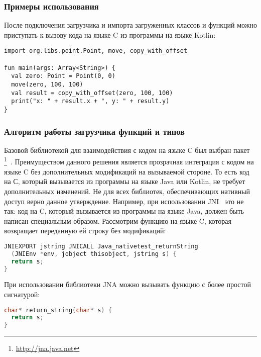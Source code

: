 \subsubsection{Примеры использования}
После подключения загрузчика и импорта загруженных классов и функций можно приступать к вызову кода на языке C из программы на языке Kotlin:
\begin{lstlisting}[caption={Пример работы с функциями и структурами данных, загруженных из заголовочного файла~\ref{point-h-example}.}, label=point-example]
import org.libs.point.Point, move, copy_with_offset

fun main(args: Array<String>) {
  val zero: Point = Point(0, 0)
  move(zero, 100, 100)
  val result = copy_with_offset(zero, 100, 100)
  print("x: " + result.x + ", y: " + result.y)
}
\end{lstlisting}
\subsubsection{Алгоритм работы загрузчика функций и типов}

Базовой библиотекой для взаимодействия с кодом на языке C был выбран пакет \footnote{\url{http://jna.java.net}}~\cite{jna-book}.
Преимуществом данного решения является прозрачная интеграция с кодом на языке C без дополнительных модификаций на вызываемой стороне.
То есть код на С, который вызывается из программы на языке Java или Kotlin, не требует дополнительных изменений.
Не для всех библиотек, обеспечивающих нативный доступ верно данное утверждение. 
Например, при использовании JNI~\cite{jni-spec} это не так: код на C, который вызывается из программы на языке Java, должен быть написан специальным образом.
Рассмотрим функцию на языке C, которая возвращает переданную ей строку без модификаций:

\begin{lstlisting}[language=C, caption={Пример функции на языке C, которая доступна для вызова через библиотеку JNI.}, label=jni-example]
JNIEXPORT jstring JNICALL Java_nativetest_returnString
  (JNIEnv *env, jobject thisobject, jstring s) {
  return s;
}
\end{lstlisting}

При использовании библиотеки JNA можно вызывать функцию с более простой сигнатурой:
\begin{lstlisting}[language=C, caption={Пример функции на языке C, аналогичной функции из примера~\ref{jni-example}, которая доступна для вызова через библиотеку JNA.}, label=jna-example]
char* return_string(char* s) {
  return s;
}
\end{lstlisting}

